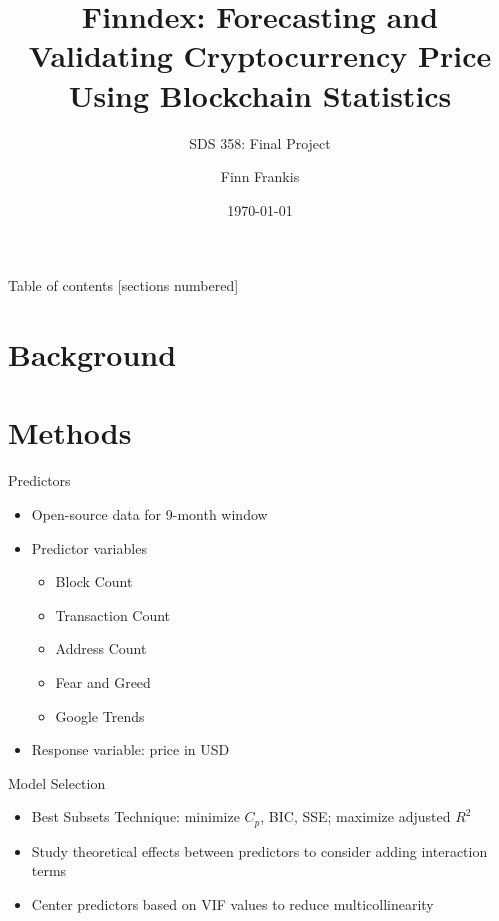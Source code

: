 \documentclass[10pt]{beamer}
\title{Finndex: Forecasting and Validating Cryptocurrency Price Using Blockchain Statistics}
\subtitle{SDS 358: Final Project}
\date{\today}
\author{Finn Frankis}
\begin{document}
    
    \maketitle
    
    \begin{frame}{Table of contents}
      [sections numbered]
      \tableofcontents[hideallsubsections]
    \end{frame}
    \section{Background}

    \section{Methods}
    \begin{frame}[fragile]{Predictors}
        \begin{itemize}
            \item Open-source data for 9-month window
            \item Predictor variables
            \begin{itemize}
            \item Block Count
            \item Transaction Count
            \item Address Count
            \item Fear and Greed
            \item Google Trends
            \end{itemize}
            \item Response variable: price in USD
        \end{itemize}
    \end{frame}

    \begin{frame}[fragile]{Model Selection}
        \begin{itemize} 
            \item Best Subsets Technique: minimize $C_p$, BIC, SSE; maximize adjusted $R^2$
            \item Study theoretical effects between predictors to consider adding interaction terms
            \item Center predictors based on VIF values to reduce multicollinearity 
        \end{itemize}
    \end{frame}
\end{document}
